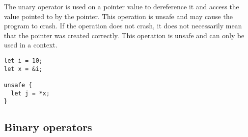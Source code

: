 The unary operator \token{*} is used on a pointer value to dereference it and
access the value pointed to by the pointer. This operation is unsafe and may
cause the program to crash. If the operation does not crash, it does not
necessarily mean that the pointer was created correctly. This operation is
unsafe and can only be used in a  context.
\smallskip

\begin{lstlisting}[style=coloredverbatim]
let i = 10;
let x = &i;

unsafe {
  let j = *x;
}
\end{lstlisting}

\subsection {Binary operators}

